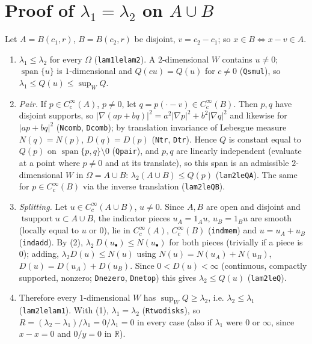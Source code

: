 \documentclass[11pt]{article}
\renewcommand{\_}{\oldus\allowbreak}
\theoremstyle{definition}
\theoremstyle{remark}
\begin{document}
\section{Proof of $\lambda_1=\lambda_2$ on $A\cup B$}

Let $A=B(c_1,r)$, $B=B(c_2,r)$ be disjoint, $v=c_2-c_1$; so $x\in B\iff x-v\in A$.
\begin{enumerate}
  \item $\lambda_1\le\lambda_2$ for every $\Omega$ (\texttt{lam1\_le\_lam2}). A $2$-dimensional $W$ contains
        $u\neq0$; $\operatorname{span}\{u\}$ is $1$-dimensional and $Q(cu)=Q(u)$ for $c\neq0$
        (\texttt{Q\_smul}), so $\lambda_1\le Q(u)\le\sup_WQ$.
  \item \emph{Pair.} If $p\in C_c^\infty(A)$, $p\neq0$, let $q=p(\cdot-v)\in C_c^\infty(B)$. Then $p,q$ have
        disjoint supports, so $|\nabla(ap+bq)|^2=a^2|\nabla p|^2+b^2|\nabla q|^2$ and likewise for $|ap+bq|^2$
        (\texttt{N\_comb}, \texttt{D\_comb}); by translation invariance of Lebesgue measure
        $N(q)=N(p)$, $D(q)=D(p)$ (\texttt{N\_tr}, \texttt{D\_tr}). Hence $Q$ is constant equal to $Q(p)$ on
        $\operatorname{span}\{p,q\}\setminus0$ (\texttt{Q\_pair}), and $p,q$ are linearly independent
        (evaluate at a point where $p\neq0$ and at its translate), so this span is an admissible
        $2$-dimensional $W$ in $\Omega=A\cup B$: $\lambda_2(A\cup B)\le Q(p)$ (\texttt{lam2\_le\_Q\_A}).
        The same for $p\in C_c^\infty(B)$ via the inverse translation (\texttt{lam2\_le\_Q\_B}).
  \item \emph{Splitting.} Let $u\in C_c^\infty(A\cup B)$, $u\neq0$. Since $A,B$ are open and disjoint and
        $\operatorname{tsupport}u\subset A\cup B$, the indicator pieces $u_A=1_Au$, $u_B=1_Bu$ are smooth
        (locally equal to $u$ or $0$), lie in $C_c^\infty(A)$, $C_c^\infty(B)$ (\texttt{ind\_mem}) and
        $u=u_A+u_B$ (\texttt{ind\_add}). By (2), $\lambda_2\,D(u_\bullet)\le N(u_\bullet)$ for both pieces
        (trivially if a piece is $0$); adding, $\lambda_2D(u)\le N(u)$ using
        $N(u)=N(u_A)+N(u_B)$, $D(u)=D(u_A)+D(u_B)$. Since $0<D(u)<\infty$ (continuous, compactly supported,
        nonzero; \texttt{D\_ne\_zero}, \texttt{D\_ne\_top}) this gives $\lambda_2\le Q(u)$
        (\texttt{lam2\_le\_Q}).
  \item Therefore every $1$-dimensional $W$ has $\sup_WQ\ge\lambda_2$, i.e. $\lambda_2\le\lambda_1$
        (\texttt{lam2\_le\_lam1}). With (1), $\lambda_1=\lambda_2$ (\texttt{R\_two\_disks}), so
        $R=(\lambda_2-\lambda_1)/\lambda_1=0/\lambda_1=0$ in every case (also if $\lambda_1$ were $0$ or
        $\infty$, since $x-x=0$ and $0/y=0$ in $\mathbb R$).
\end{enumerate}
\end{document}
